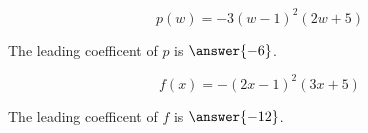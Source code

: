 \documentclass{ximera}
\begin{document}
\begin{example}
\begin{question}


\[
p(w) = -3(w-1)^2(2w+5)
\]


The leading coefficent of $p$ is $\answer{-6}$.

\end{question}











\begin{question}


\[
f(x) = -(2x-1)^2(3x+5)
\]


The leading coefficent of $f$ is $\answer{-12}$.

\end{question}






\end{example}
\end{document}
